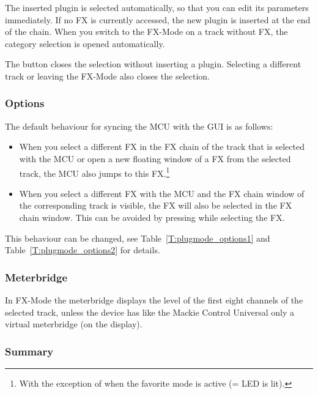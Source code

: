 The inserted plugin is selected automatically, so that you can edit its
parameters immediately. If no FX is currently accessed, the new plugin
is inserted at the end of the chain. When you switch to the FX-Mode on a
track without FX, the category selection is
opened automatically.

The \cancel button closes the selection without inserting a plugin.
Selecting a different track or leaving the FX-Mode also closes the
selection.

\subsubsection{Options}\label{plugsync}
The default behaviour for syncing the MCU with the \reaper GUI is as follows: 
\begin{itemize}
\item When you select a different FX in the FX chain of the track that is
  selected with the MCU or open a new floating window of a FX from the 
  selected track, the MCU also jumps to this FX.\footnote{With the exception 
    of when the favorite mode is active (= \gv LED is lit).}
\item When you select a different FX with the MCU and the \reaper FX chain
  window of the corresponding track is visible, the FX will also be selected in
  the FX chain window. This can be avoided by pressing \option while selecting the FX.
\end{itemize}

\noindent
This behaviour can be changed, see Table~\ref{T:plugmode_options1} and
Table~\ref{T:plugmode_options2} for details.

\vspace{-1mm}

\subsubsection{Meterbridge}
In FX-Mode the meterbridge displays the level of the first eight
channels of the selected track, unless the device has like the Mackie Control Universal only a virtual 
meterbridge (on the display).


\subsubsection{Summary}

